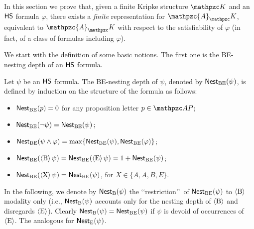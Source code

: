 In this section we prove that, given a finite Kripke structure $\Ku$ and an $\text{\sffamily HS}$ formula $\varphi$, there exists a \emph{finite} representation for $\mathpzc{A}_\Ku$, equivalent to $\mathpzc{A}_\Ku$ with respect to the satisfiability of $\varphi$ (in fact, of a class of formulas including $\varphi$).

We start with the definition of some basic notions. The first one is the \mbox{BE-nesting} depth of an $\text{\sffamily HS}$ formula.

\begin{definition}\label{defnest}
Let $\psi$ be an $\text{\sffamily HS}$ formula. The BE-nesting depth of $\psi$, denoted by $\operatorname{\mathsf{Nest}_{BE}}(\psi)$, is defined by induction on the structure of the formula as follows:
    \begin{itemize}
        \item $\operatorname{\mathsf{Nest}_{BE}}(p)=0$ for any proposition letter $p\in\Prop$;
        \item $\operatorname{\mathsf{Nest}_{BE}}(\neg\psi)=\operatorname{\mathsf{Nest}_{BE}}(\psi)$;
        \item $\operatorname{\mathsf{Nest}_{BE}}(\psi\wedge\varphi)=\max\{\operatorname{\mathsf{Nest}_{BE}}(\psi),\operatorname{\mathsf{Nest}_{BE}}(\varphi)\}$;
        \item $\operatorname{\mathsf{Nest}_{BE}}(\operatorname{\langle B\rangle}\psi)=\operatorname{\mathsf{Nest}_{BE}}(\operatorname{\langle E\rangle}\psi)=1+\operatorname{\mathsf{Nest}_{BE}}(\psi)$;
        \item $\operatorname{\mathsf{Nest}_{BE}}(\operatorname{\langle X\rangle}\psi)=\operatorname{\mathsf{Nest}_{BE}}(\psi)$, for $X\in\{A, \overline{A}, \overline{B},                           \overline{E}\}$.
    \end{itemize}
\end{definition}
In the following, we denote by $\operatorname{\mathsf{Nest}_B}(\psi)$ the \lq\lq restriction\rq\rq\ of $\operatorname{\mathsf{Nest}_{BE}}(\psi)$ to $\operatorname{\langle B\rangle}$ modality only (i.e., $\operatorname{\mathsf{Nest}_B}(\psi)$ accounts only for the nesting depth of $\operatorname{\langle B\rangle}$ and disregards $\operatorname{\langle E\rangle}$). Clearly $\operatorname{\mathsf{Nest}_B}(\psi)=\operatorname{\mathsf{Nest}_{BE}}(\psi)$ if $\psi$ is devoid of occurrences of $\operatorname{\langle E\rangle}$. The analogous for $\operatorname{\mathsf{Nest}_E}(\psi)$.


